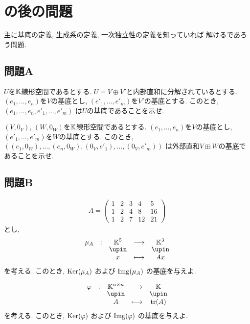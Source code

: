 \section{の後の問題}
主に基底の定義, 生成系の定義, 一次独立性の定義を知っていれば
解けるであろう問題.
\subsection{問題A}
\begin{quiz}
  $U$を$\mathbb{K}$線形空間であるとする.
  $U=V\oplus V'$と内部直和に分解されているとする.
  $(e_1,\ldots,e_n)$を$V$の基底とし,
  $(e'_1,\ldots,e'_m)$を$V'$の基底とする.
  このとき,
  $(e_1,\ldots,e_n,e'_1,\ldots,e'_m)$
  は$U$の基底であることを示せ.  
\end{quiz}
\begin{quiz}
  $(V,0_V)$, $(W,0_W)$を$\mathbb{K}$線形空間であるとする.
  $(e_1,\ldots,e_n)$を$V$の基底とし,
  $(e'_1,\ldots,e'_m)$を$W$の基底とする.
  このとき,
  $((e_1,0_W),\ldots,(e_n,0_W),(0_V,e'_1),\ldots,(0_V,e'_m))$
  は外部直和$V\boxplus W$の基底であることを示せ.  
\end{quiz}

\subsection{問題B}


\begin{quiz}
  \begin{align*}
    A=
    \begin{pmatrix}
      1&2&3&4&5\\
      1&2&4&8&16\\
      1&2&7&12&21
    \end{pmatrix}
  \end{align*}
  とし,
  \begin{align*}
    \shazo{\mu_A}{\KK^5}{\KK^3}
    {x}{Ax}
  \end{align*}
  を考える.
  このとき,
  $\operatorname{Ker}(\mu_A)$
  および
  $\operatorname{Img}(\mu_A)$
  の基底を与えよ.
\end{quiz}

\begin{quiz}
  \begin{align*}
    \shazo{\varphi}{\KK^{n\times n}}{\KK}
    {A}{\tr(A)}
  \end{align*}
  を考える.
  このとき,
  $\operatorname{Ker}(\varphi)$
  および
  $\operatorname{Img}(\varphi)$
  の基底を与えよ.
\end{quiz}

